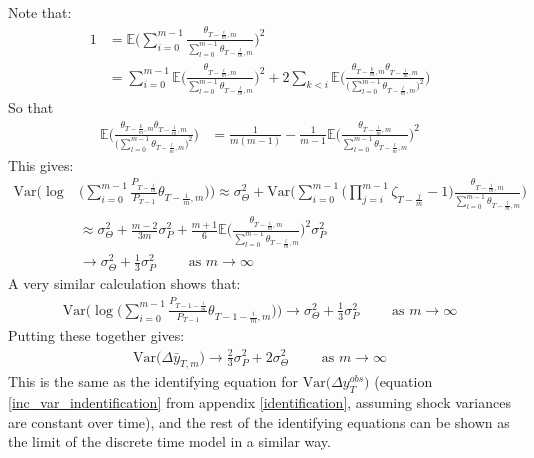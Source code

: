 Note that:
\begin{align*}
1 &= \mathbb{E} \Bigg(\sum_{i=0}^{m-1} \frac{\theta_{T-\frac{i}{m},m}}{\sum_{l=0}^{m-1} \theta_{T-\frac{l}{m},m}} \Bigg)^2 \\
&= \sum_{i=0}^{m-1}\mathbb{E} \Bigg( \frac{\theta_{T-\frac{i}{m},m}}{\sum_{l=0}^{m-1} \theta_{T-\frac{l}{m},m}} \Bigg)^2 + 2 \sum_{k<i} \mathbb{E} \Bigg( \frac{\theta_{T-\frac{k}{m},m} \theta_{T-\frac{i}{m},m}}{\Big( \sum_{l=0}^{m-1} \theta_{T-\frac{l}{m},m} \Big)^2} \Bigg) 
\end{align*}
So that
\begin{align*}
\mathbb{E} \Bigg( \frac{\theta_{T-\frac{k}{m},m} \theta_{T-\frac{i}{m},m}}{\Big( \sum_{l=0}^{m-1} \theta_{T-\frac{l}{m},m} \Big)^2} \Bigg) &= \frac{1}{m(m-1)} -\frac{1}{m-1} \mathbb{E} \Bigg( \frac{\theta_{T-\frac{i}{m},m}}{\sum_{l=0}^{m-1} \theta_{T-\frac{l}{m},m}} \Bigg)^2
\end{align*}
This gives:
\begin{align*}
\mathrm{Var}\Bigg(\log &\Bigg(\sum_{i=0}^{m-1} \frac{P_{T-\frac{i}{m}}}{P_{T-1}} \theta_{T-\frac{i}{m},m} \Bigg) \Bigg)
\approx \sigma^2_{\Theta} + \mathrm{Var}\Bigg( \sum_{i=0}^{m-1} \Big(\prod_{j=i}^{m-1} \zeta_{T-\frac{j}{m}}   -1\Big) \frac{\theta_{T-\frac{i}{m},m}}{\sum_{l=0}^{m-1} \theta_{T-\frac{l}{m},m}} \Bigg) \\
&\approx \sigma^2_{\Theta} +  \frac{m-2}{3m} \sigma^2_P +  \frac{m+1}{6}\mathbb{E} \Bigg(\frac{\theta_{T-\frac{i}{m},m}}{\sum_{l=0}^{m-1} \theta_{T-\frac{l}{m},m}} \Bigg)^2 \sigma^2_P \\
& \rightarrow \sigma^2_{\Theta} +  \frac{1}{3} \sigma^2_P \qquad \text{  as } m\rightarrow \infty
\end{align*}
A very similar calculation shows that:
\begin{align*}
\mathrm{Var}\Bigg(\log\Bigg(\sum_{i=0}^{m-1}\frac{ P_{T-1-\frac{i}{m}}}{P_{T-1}} \theta_{T-1-\frac{i}{m},m}\Bigg) \Bigg) \rightarrow \sigma^2_{\Theta} +  \frac{1}{3} \sigma^2_P \qquad \text{  as } m\rightarrow \infty
\end{align*}
Putting these together gives:
\begin{align*}
\mathrm{Var}\Big(\Delta \bar{y}_{T,m}\Big)  \rightarrow \frac{2}{3}\sigma^2_P + 2\sigma^2_{\Theta} \qquad \text{  as } m\rightarrow \infty
\end{align*}
This is the same as the identifying equation for $\mathrm{Var}\Big(\Delta y^{obs}_T \Big)$ (equation \ref{inc_var_indentification} from appendix \ref{identification}, assuming shock variances are constant over time), and the rest of the identifying equations can be shown as the limit of the discrete time model in a similar way.





